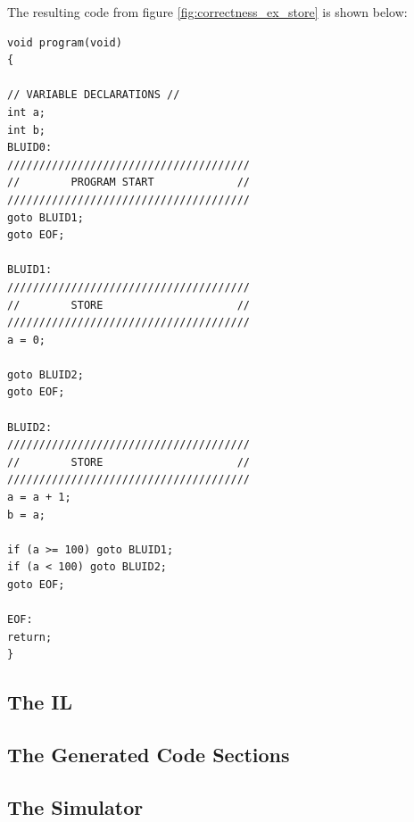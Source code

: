 The resulting code from figure \ref{fig:correctness_ex_store} is shown below:

\begin{minipage}{\textwidth}
\begin{lstlisting}[frame=single]
void program(void)
{

// VARIABLE DECLARATIONS //
int a;
int b;
BLUID0:
//////////////////////////////////////
//        PROGRAM START             //
//////////////////////////////////////
goto BLUID1;
goto EOF;

BLUID1:
//////////////////////////////////////
//        STORE                     //
//////////////////////////////////////
a = 0;

goto BLUID2;
goto EOF;

BLUID2:
//////////////////////////////////////
//        STORE                     //
//////////////////////////////////////
a = a + 1;
b = a;

if (a >= 100) goto BLUID1;
if (a < 100) goto BLUID2;
goto EOF;

EOF:
return;
}
\end{lstlisting}
\end{minipage}





\subsection{The IL}
\subsection{The Generated Code Sections}
\subsection{The Simulator}